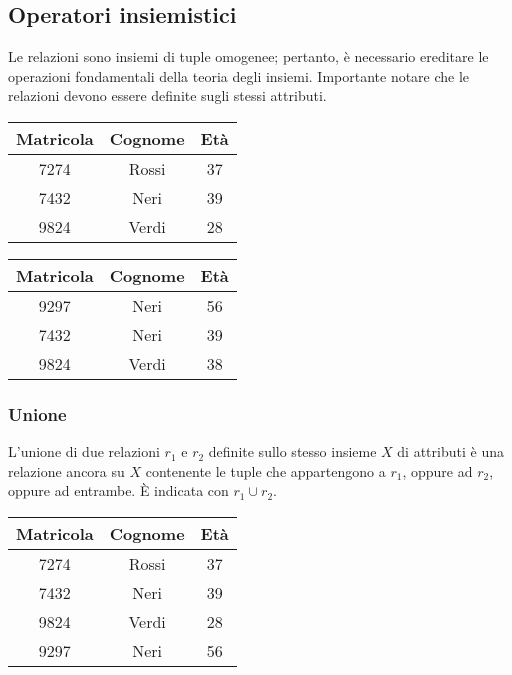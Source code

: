 \documentclass{article}
\begin{document}
\subsection*{Operatori insiemistici}
Le relazioni sono insiemi di tuple omogenee; pertanto, è necessario ereditare le operazioni fondamentali della teoria degli insiemi.
Importante notare che le relazioni devono essere definite sugli stessi attributi.

\begin{table}[htbp]
\centering
\begin{tabular}{|c|c|c|}
\hline
Matricola & Cognome & Età \\ \hline
7274      & Rossi   & 37  \\ \hline
7432      & Neri    & 39  \\ \hline
9824      & Verdi   & 28  \\ \hline
\end{tabular}
\end{table}

\begin{table}[htbp]
\centering
\begin{tabular}{|c|c|c|}
\hline
Matricola & Cognome & Età \\ \hline
9297      & Neri    & 56  \\ \hline
7432      & Neri    & 39  \\ \hline
9824      & Verdi   & 38  \\ \hline
\end{tabular}
\end{table}

\subsubsection*{Unione}
L'unione di due relazioni $r_1$ e $r_2$ definite sullo stesso insieme $X$ di attributi è una relazione ancora su $X$ contenente le tuple che appartengono a $r_1$, oppure ad $r_2$, oppure ad entrambe. È indicata con $r_1 \cup r_2$.

\begin{table}[htbp]
\centering
\begin{tabular}{|c|c|c|}
\hline
Matricola & Cognome & Età \\ \hline
7274      & Rossi   & 37  \\ \hline
7432      & Neri    & 39  \\ \hline
9824      & Verdi   & 28  \\ \hline
9297      & Neri    & 56  \\ \hline
\end{tabular}
\end{table}
\end{document}
